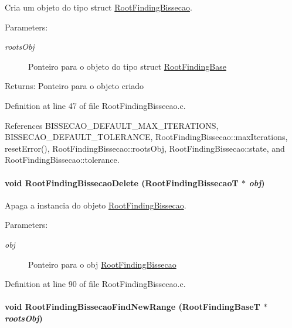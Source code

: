 Cria um objeto do tipo struct \hyperlink{structRootFindingBissecao}{RootFindingBissecao}. 

\begin{Desc}
\item[Parameters:]
\begin{description}
\item[{\em rootsObj}]Ponteiro para o objeto do tipo struct \hyperlink{structRootFindingBase}{RootFindingBase} \end{description}
\end{Desc}
\begin{Desc}
\item[Returns:]Ponteiro para o objeto criado \end{Desc}


Definition at line 47 of file RootFindingBissecao.c.

References BISSECAO\_\-DEFAULT\_\-MAX\_\-ITERATIONS, BISSECAO\_\-DEFAULT\_\-TOLERANCE, RootFindingBissecao::maxIterations, resetError(), RootFindingBissecao::rootsObj, RootFindingBissecao::state, and RootFindingBissecao::tolerance.\hypertarget{group____bissecao_g9c2a72c616c6ae34254a9a807394ecb5}{
\paragraph[RootFindingBissecaoDelete]{\setlength{\rightskip}{0pt plus 5cm}void RootFindingBissecaoDelete ({\bf RootFindingBissecaoT} $\ast$ {\em obj})}\hfill}
\label{group____bissecao_g9c2a72c616c6ae34254a9a807394ecb5}


Apaga a instancia do objeto \hyperlink{structRootFindingBissecao}{RootFindingBissecao}. 

\begin{Desc}
\item[Parameters:]
\begin{description}
\item[{\em obj}]Ponteiro para o obj \hyperlink{structRootFindingBissecao}{RootFindingBissecao} \end{description}
\end{Desc}


Definition at line 90 of file RootFindingBissecao.c.\hypertarget{group____bissecao_gee709dc3b98a74148de8312b12373bcc}{
\paragraph[RootFindingBissecaoFindNewRange]{\setlength{\rightskip}{0pt plus 5cm}void RootFindingBissecaoFindNewRange ({\bf RootFindingBaseT} $\ast$ {\em rootsObj})}\hfill}
\label{group____bissecao_gee709dc3b98a74148de8312b12373bcc}



